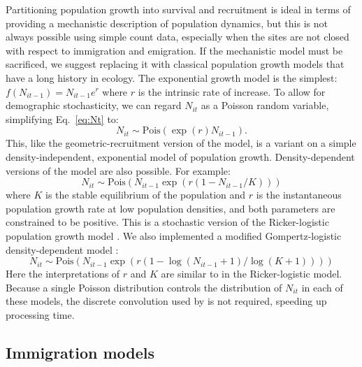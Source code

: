 \documentclass[12pt]{article}
\begin{document}
Partitioning population growth into survival and recruitment
is ideal in terms of providing a mechanistic description of population
dynamics, but this is not always possible using simple count data,
especially when the sites are not closed with respect to immigration
and emigration. %
If the mechanistic model must be sacrificed, we suggest replacing it
with classical population growth models that have a long history in
ecology. The exponential growth model is the simplest: 
$f(N_{it-1}) = N_{it-1}e^r$ where $r$ is the intrinsic
rate of increase. %
To allow for demographic stochasticity, we can regard $N_{it}$ as a Poisson 
random variable, simplifying Eq.~\ref{eq:Nt} to:
\begin{equation}
  N_{it} \sim \text{Pois}(\exp(r)N_{it-1}).
\label{eq:exp}
\end{equation}
This,
like the geometric-recruitment version of the model, is a variant on a simple
density-independent, exponential model of population growth.
Density-dependent versions of the model are also possible.  For
example:
\begin{equation}
  N_{it} \sim \text{Pois}(N_{it-1}\exp(r(1-N_{it-1}/K)))
\label{eq:rick}
\end{equation}
where $K$ is the stable equilibrium of the population and $r$ is
the
instantaneous population growth rate at low population
densities, and
both parameters are constrained to be positive. This is a
stochastic version
of the Ricker-logistic population growth model
\citep{ricker:1954}. We also
implemented a modified Gompertz-logistic density-dependent
model \citep{hart_gotelli:2011}:
\begin{equation}
N_{it} \sim
\text{Pois}(N_{it-1}\exp(r(1-\log(N_{it-1}+1)/\log(K+1))))
\label{eq:gomp}
\end{equation}
Here the interpretations of $r$ and $K$ are similar to in the
Ricker-logistic model.
Because a single Poisson distribution controls the
distribution of $N_{it}$ in each of these models, the discrete
convolution used by \citet{dail_madsen:2011} is not required,
speeding up processing time.



\subsection{Immigration models}
\end{document}
